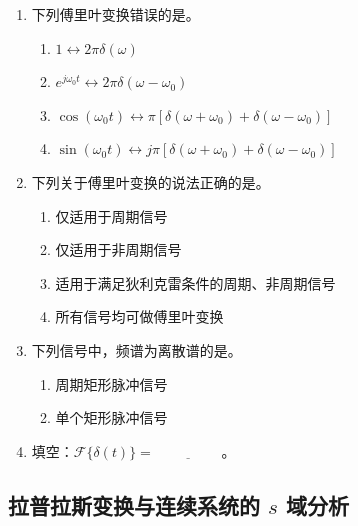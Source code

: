 \documentclass[12pt,a4paper]{ctexart}
\begin{document}
\begin{enumerate}[label=\arabic*.]
\item 下列傅里叶变换错误的是\underline{\hspace{2cm}}。
\begin{enumerate}[label=\Alph*.]
\item $1\longleftrightarrow 2\pi\delta(\omega)$
\item $e^{j\omega_0t}\longleftrightarrow 2\pi\delta(\omega-\omega_0)$
\item $\cos(\omega_0t)\longleftrightarrow \pi[\delta(\omega+\omega_0)+\delta(\omega-\omega_0)]$
\item $\sin(\omega_0t)\longleftrightarrow j\pi[\delta(\omega+\omega_0)+\delta(\omega-\omega_0)]$
\end{enumerate}

\item 下列关于傅里叶变换的说法正确的是\underline{\hspace{2cm}}。
\begin{enumerate}[label=\Alph*.]
\item 仅适用于周期信号
\item 仅适用于非周期信号
\item 适用于满足狄利克雷条件的周期、非周期信号
\item 所有信号均可做傅里叶变换
\end{enumerate}

\item 下列信号中，频谱为离散谱的是\underline{\hspace{2cm}}。
\begin{enumerate}[label=\Alph*.]
\item 周期矩形脉冲信号
\item 单个矩形脉冲信号
\end{enumerate}

\item 填空：\(\displaystyle \mathcal{F}\{\delta(t)\}=\underline{\hspace{2cm}}\)。
\end{enumerate}

\subsection{拉普拉斯变换与连续系统的 $s$ 域分析}
\end{document}
